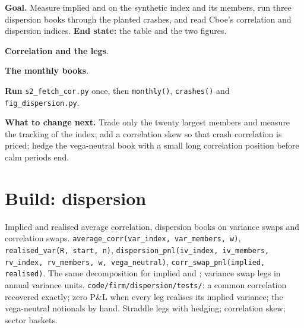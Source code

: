 \begin{tutorial}
\textbf{Goal.} Measure implied and  on the synthetic index and its members, run three dispersion books through the planted
crashes, and read Cboe's correlation and dispersion indices. \textbf{End state:} the table and the two figures.
\begin{tutsteps}
\item \textbf{Correlation and the legs}.
\label{lst:s2:dispersion-and-correlation:legs}
\item \textbf{The monthly books}.
\label{lst:s2:dispersion-and-correlation:books}
\item \textbf{Run} \texttt{s2\_fetch\_cor.py} once, then \texttt{monthly()}, \texttt{crashes()} and \texttt{fig\_dispersion.py}.
\end{tutsteps}
\textbf{What to change next.} Trade only the twenty largest members and measure the tracking of the index; add a correlation skew so that crash
correlation is priced; hedge the vega-neutral book with a small long correlation position before calm periods end.
\end{tutorial}

\section{Build: dispersion}\label{bld:s2:dispersion-and-correlation:dispersion}

\begin{build}
 Implied and realised average correlation, dispersion books on variance swaps and correlation swaps.
 \texttt{average\_corr(var\_index, var\_members, w)}, \texttt{realised\_var(R, start, n)}, \texttt{dispersion\_pnl(iv\_index,
iv\_members, rv\_index, rv\_members, w, vega\_neutral)}, \texttt{corr\_swap\_pnl(implied, realised)}.
 The same decomposition for implied and ; variance swap legs in annual variance units.
 \texttt{code/firm/dispersion/tests/}: a common correlation recovered exactly; zero P\&L when every leg realises its implied
variance; the vega-neutral notionals by hand.
 Straddle legs with hedging; correlation skew; sector baskets.
\end{build}

